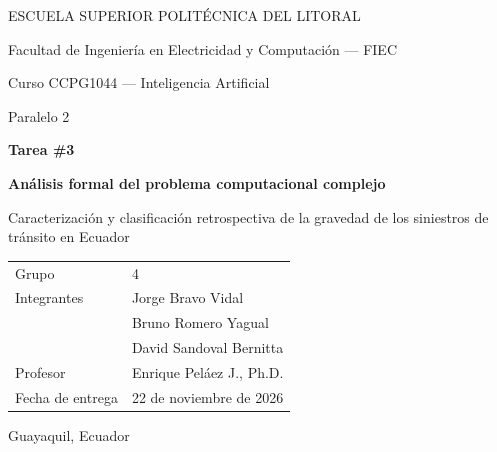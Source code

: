 \documentclass[11pt,a4paper,spanish]{article}
\begin{document}
\begin{titlepage}
\centering
{\large ESCUELA SUPERIOR POLITÉCNICA DEL LITORAL\par}
\vspace{0.4em}
{\large Facultad de Ingeniería en Electricidad y Computación --- FIEC\par}
\vspace{1.2em}
{\large Curso CCPG1044 --- Inteligencia Artificial\par}
\vspace{0.6em}
{\normalsize Paralelo 2\par}

\vspace{2.6cm}
{\Large\bfseries Tarea \#3\par}
\vspace{0.4em}
{\Large\bfseries Análisis formal del problema computacional complejo\par}
\vspace{1.0em}
{\large Caracterización y clasificación retrospectiva de la gravedad de los siniestros de tránsito en Ecuador\par}

\vspace{2.4cm}
\begin{tabular}{ll}
Grupo & 4 \\
Integrantes & Jorge Bravo Vidal \\
            & Bruno Romero Yagual \\
            & David Sandoval Bernitta \\
Profesor & Enrique Peláez J., Ph.D. \\
Fecha de entrega & 22 de noviembre de 2026
\end{tabular}

\vspace{1.6cm}
{\normalsize Guayaquil, Ecuador}
\end{titlepage}

\thispagestyle{empty}
\newpage

{\setlength{\parskip}{0pt}\linespread{1.0}\selectfont\tableofcontents}
\newpage












\appendix



\renewcommand{\thesection}{\arabic{section}}
\setcounter{section}{11}

\end{document}
